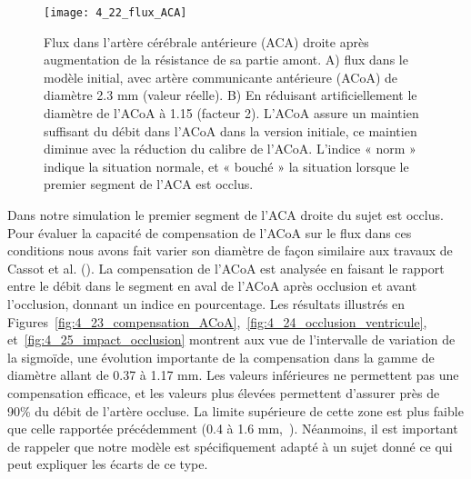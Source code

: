 \begin{figure}[!t]
\centering
\texttt{[image: 4\_22\_flux\_ACA]}
\caption{ Flux dans l'artère cérébrale antérieure (ACA) droite après augmentation de la résistance de sa partie amont. A)
flux dans le modèle initial, avec artère communicante antérieure (ACoA) de diamètre 2.3 mm (valeur réelle). B) En réduisant
artificiellement le diamètre de l’ACoA à 1.15 (facteur 2). L’ACoA assure un maintien suffisant du débit dans l’ACoA dans la
version initiale, ce maintien diminue avec la réduction du calibre de l’ACoA. L’indice « norm » indique la situation normale, et
« bouché » la situation lorsque le premier segment de l’ACA est occlus.}
\label{fig:4_22_flux_ACA}	
\end{figure}
Dans notre simulation le premier segment de l’ACA droite du sujet est occlus. Pour évaluer la
capacité de compensation de l’ACoA sur le flux dans ces conditions nous avons fait varier son diamètre
de façon similaire aux travaux de Cassot et al. (\cite{Cassot1995}). La compensation de l’ACoA est analysée en faisant
le rapport entre le débit dans le segment en aval de l’ACoA après occlusion et avant l’occlusion,
donnant un indice en pourcentage. Les résultats illustrés en Figures~\ref{fig:4_23_compensation_ACoA},~\ref{fig:4_24_occlusion_ventricule}, et~\ref{fig:4_25_impact_occlusion} montrent aux vue de l’intervalle
de variation de la sigmoïde, une évolution importante de la compensation dans la gamme de diamètre
allant de 0.37 à 1.17 mm. Les valeurs inférieures ne permettent pas une compensation efficace, et les
valeurs plus élevées permettent d’assurer près de 90\% du débit de l’artère occluse. La limite supérieure
de cette zone est plus faible que celle rapportée précédemment (0.4 à 1.6 mm,~\cite{Cassot1995}). Néanmoins, il est
important de rappeler que notre modèle est spécifiquement adapté à un sujet donné ce qui peut
expliquer les écarts de ce type.

